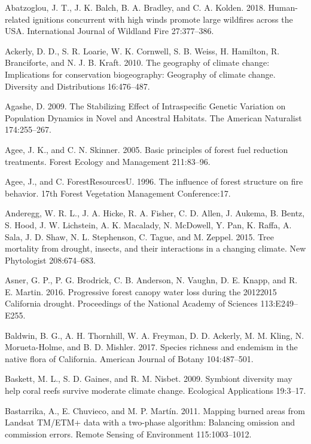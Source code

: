 \documentclass[twoside,12pt,final]{ucthesis-CA2012}
\begin{document}
\begin{ucmainmatter}
\hypertarget{ref-abatzoglou2018a}{}
Abatzoglou, J. T., J. K. Balch, B. A. Bradley, and C. A. Kolden. 2018.
Human-related ignitions concurrent with high winds promote large
wildfires across the USA. International Journal of Wildland Fire
27:377--386.

\hypertarget{ref-ackerly2010}{}
Ackerly, D. D., S. R. Loarie, W. K. Cornwell, S. B. Weiss, H. Hamilton,
R. Branciforte, and N. J. B. Kraft. 2010. The geography of climate
change: Implications for conservation biogeography: Geography of climate
change. Diversity and Distributions 16:476--487.

\hypertarget{ref-agashe2009}{}
Agashe, D. 2009. The Stabilizing Effect of Intraspecific Genetic
Variation on Population Dynamics in Novel and Ancestral Habitats. The
American Naturalist 174:255--267.

\hypertarget{ref-agee2005}{}
Agee, J. K., and C. N. Skinner. 2005. Basic principles of forest fuel
reduction treatments. Forest Ecology and Management 211:83--96.

\hypertarget{ref-agee1996}{}
Agee, J., and C. ForestResourcesU. 1996. The influence of forest
structure on fire behavior. 17th Forest Vegetation Management
Conference:17.

\hypertarget{ref-anderegg2015a}{}
Anderegg, W. R. L., J. A. Hicke, R. A. Fisher, C. D. Allen, J. Aukema,
B. Bentz, S. Hood, J. W. Lichstein, A. K. Macalady, N. McDowell, Y. Pan,
K. Raffa, A. Sala, J. D. Shaw, N. L. Stephenson, C. Tague, and M.
Zeppel. 2015. Tree mortality from drought, insects, and their
interactions in a changing climate. New Phytologist 208:674--683.

\hypertarget{ref-asner2016}{}
Asner, G. P., P. G. Brodrick, C. B. Anderson, N. Vaughn, D. E. Knapp,
and R. E. Martin. 2016. Progressive forest canopy water loss during the
20122015 California drought. Proceedings of the National Academy of
Sciences 113:E249--E255.

\hypertarget{ref-baldwin2017a}{}
Baldwin, B. G., A. H. Thornhill, W. A. Freyman, D. D. Ackerly, M. M.
Kling, N. Morueta-Holme, and B. D. Mishler. 2017. Species richness and
endemism in the native flora of California. American Journal of Botany
104:487--501.

\hypertarget{ref-baskett2009}{}
Baskett, M. L., S. D. Gaines, and R. M. Nisbet. 2009. Symbiont diversity
may help coral reefs survive moderate climate change. Ecological
Applications 19:3--17.

\hypertarget{ref-bastarrika2011}{}
Bastarrika, A., E. Chuvieco, and M. P. Martín. 2011. Mapping burned
areas from Landsat TM/ETM+ data with a two-phase algorithm: Balancing
omission and commission errors. Remote Sensing of Environment
115:1003--1012.


\end{ucmainmatter}
\end{document}
